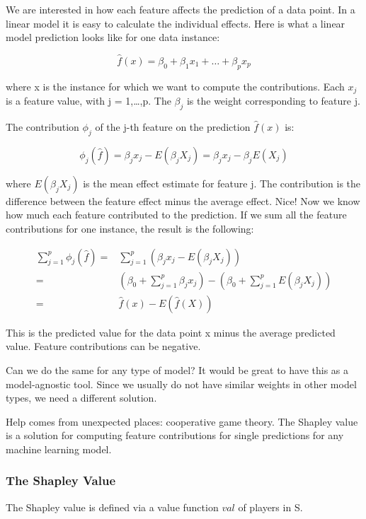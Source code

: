 \documentclass[
  10pt,
]{scrbook}
\begin{document}
We are interested in how each feature affects the prediction of a data point.
In a linear model it is easy to calculate the individual effects.
Here is what a linear model prediction looks like for one data instance:

\[\hat{f}(x)=\beta_0+\beta_{1}x_{1}+\ldots+\beta_{p}x_{p}\]

where x is the instance for which we want to compute the contributions.
Each \(x_j\) is a feature value, with j = 1,\ldots,p.
The \(\beta_j\) is the weight corresponding to feature j.

The contribution \(\phi_j\) of the j-th feature on the prediction \(\hat{f}(x)\) is:

\[\phi_j(\hat{f})=\beta_{j}x_j-E(\beta_{j}X_{j})=\beta_{j}x_j-\beta_{j}E(X_{j})\]

where \(E(\beta_jX_{j})\) is the mean effect estimate for feature j.
The contribution is the difference between the feature effect minus the average effect.
Nice!
Now we know how much each feature contributed to the prediction.
If we sum all the feature contributions for one instance, the result is the following:

\begin{align*}\sum_{j=1}^{p}\phi_j(\hat{f})=&\sum_{j=1}^p(\beta_{j}x_j-E(\beta_{j}X_{j}))\\=&(\beta_0+\sum_{j=1}^p\beta_{j}x_j)-(\beta_0+\sum_{j=1}^{p}E(\beta_{j}X_{j}))\\=&\hat{f}(x)-E(\hat{f}(X))\end{align*}

This is the predicted value for the data point x minus the average predicted value.
Feature contributions can be negative.

Can we do the same for any type of model?
It would be great to have this as a model-agnostic tool.
Since we usually do not have similar weights in other model types, we need a different solution.

Help comes from unexpected places: cooperative game theory.
The Shapley value is a solution for computing feature contributions for single predictions for any machine learning model.

\hypertarget{the-shapley-value}{%
\subsubsection{The Shapley Value}\label{the-shapley-value}}

The Shapley value is defined via a value function \(val\) of players in S.
\end{document}
